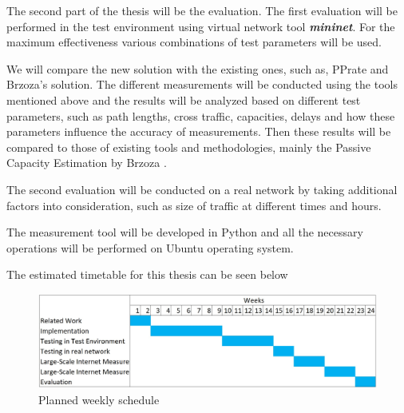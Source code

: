 \documentclass[NET,a4,12pt,ngerman]{netforms}
\begin{document}
The second part of the thesis will be the evaluation. 
The first evaluation will be performed in the test environment using virtual network tool \textbf{\textit{mininet}}. For the maximum effectiveness various combinations of test parameters will be used. 


We will compare the new solution with the existing ones, such as, PPrate\cite{PPrate} and Brzoza's solution\cite{BrzozaThesis}. The different measurements will be conducted using the tools mentioned above and the results will be analyzed based on different test parameters, such as path lengths, cross traffic, capacities, delays and how these parameters influence the accuracy of measurements. Then these results will be compared to those of existing tools and methodologies, mainly the Passive Capacity Estimation by Brzoza \cite{BrzozaThesis}. 

The second evaluation will be conducted on a real network by taking additional factors into consideration, such as size of traffic at different times and hours. 

The measurement tool will be developed in Python and all the necessary operations will be performed on Ubuntu operating system.

The estimated timetable for this thesis can be seen below\colon

\begin{figure}[h]
    \centering
    \includegraphics[scale=0.3]{images/GanttChart.jpg}
    \caption{Planned weekly schedule}
    \label{fig:mesh1}
\end{figure}
\end{document}
